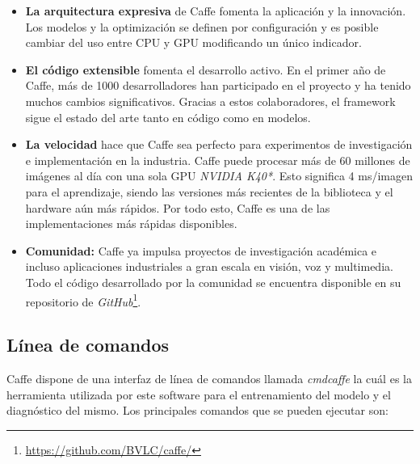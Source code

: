 \documentclass[a4paper, 12pt, oneside]{book}
\begin{document}
\begin{itemize}
\item \textbf{La arquitectura expresiva} de Caffe fomenta la aplicación y la innovación. Los modelos y la optimización se definen por configuración y es posible cambiar del uso entre CPU y GPU modificando un único indicador.
\item \textbf{El código extensible} fomenta el desarrollo activo. En el primer año de Caffe, más de 1000 desarrolladores han participado en el proyecto y ha tenido muchos cambios significativos. Gracias a estos colaboradores, el framework sigue el estado del arte tanto en código como en modelos.
\item \textbf{La velocidad} hace que Caffe sea perfecto para experimentos de investigación e implementación en la industria. Caffe puede procesar más de 60 millones de imágenes al día con una sola GPU \textit{NVIDIA K40*}. Esto significa 4 ms/imagen para el aprendizaje, siendo las versiones más recientes de la biblioteca y el hardware aún más rápidos. Por todo esto, Caffe es una de las implementaciones más rápidas disponibles.
\item \textbf{Comunidad:} Caffe ya impulsa proyectos de investigación académica e incluso aplicaciones industriales a gran escala en visión, voz y multimedia. Todo el código desarrollado por la comunidad se encuentra disponible en su repositorio de \textit{GitHub}\footnote{\url{https://github.com/BVLC/caffe/}}.
\end{itemize}

\subsection{Línea de comandos}

Caffe dispone de una interfaz de línea de comandos llamada \textit{cmdcaffe} la cuál es la herramienta utilizada por este software para el entrenamiento del modelo y el diagnóstico del mismo. Los principales comandos que se pueden ejecutar son:
\end{document}
